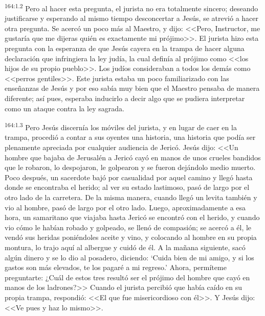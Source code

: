 \par 
\textsuperscript{164:1.2} Pero al hacer esta pregunta, el jurista no era totalmente sincero; deseando justificarse y esperando al mismo tiempo desconcertar a Jesús, se atrevió a hacer otra pregunta. Se acercó un poco más al Maestro, y dijo: <<Pero, Instructor, me gustaría que me dijeras quién es exactamente mi prójimo>>. El jurista hizo esta pregunta con la esperanza de que Jesús cayera en la trampa de hacer alguna declaración que infringiera la ley judía, la cual definía al prójimo como <<los hijos de su propio pueblo>>. Los judíos consideraban a todos los demás como <<perros gentiles>>. Este jurista estaba un poco familiarizado con las enseñanzas de Jesús y por eso sabía muy bien que el Maestro pensaba de manera diferente; así pues, esperaba inducirlo a decir algo que se pudiera interpretar como un ataque contra la ley sagrada.

\par 
\textsuperscript{164:1.3} Pero Jesús discernía los móviles del jurista, y en lugar de caer en la trampa, procedió a contar a sus oyentes una historia, una historia que podía ser plenamente apreciada por cualquier audiencia de Jericó. Jesús dijo: <<Un hombre que bajaba de Jerusalén a Jericó cayó en manos de unos crueles bandidos que le robaron, lo despojaron, le golpearon y se fueron dejándolo medio muerto. Poco después, un sacerdote bajó por casualidad por aquel camino y llegó hasta donde se encontraba el herido; al ver su estado lastimoso, pasó de largo por el otro lado de la carretera. De la misma manera, cuando llegó un levita también y vio al hombre, pasó de largo por el otro lado. Luego, aproximadamente a esa hora, un samaritano que viajaba hasta Jericó se encontró con el herido, y cuando vio cómo le habían robado y golpeado, se llenó de compasión; se acercó a él, le vendó sus heridas poniéndoles aceite y vino, y colocando al hombre en su propia montura, lo trajo aquí al albergue y cuidó de él. A la mañana siguiente, sacó algún dinero y se lo dio al posadero, diciendo: `Cuida bien de mi amigo, y si los gastos son más elevados, te los pagaré a mi regreso.' Ahora, permíteme preguntarte: ¿Cuál de estos tres resultó ser el prójimo del hombre que cayó en manos de los ladrones?>> Cuando el jurista percibió que había caído en su propia trampa, respondió: <<El que fue misericordioso con él>>. Y Jesús dijo: <<Ve pues y haz lo mismo>>.

